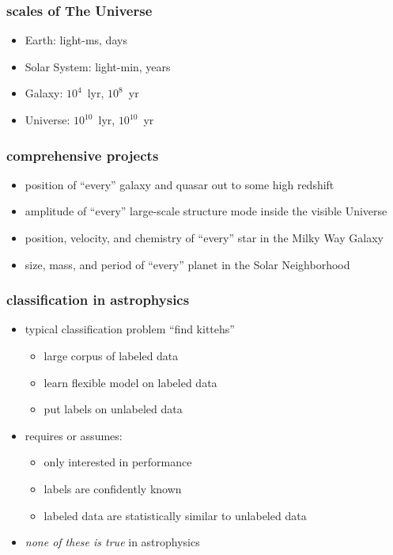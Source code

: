 \documentclass[pdftex]{beamer}
\begin{document}
\begin{frame}
  \frametitle{scales of The Universe}
  \begin{itemize}
  \item Earth: light-ms, days
  \item Solar System: light-min, years
  \item Galaxy: $10^4$~lyr, $10^8$~yr
  \item Universe: $10^10$~lyr, $10^10$~yr
  \end{itemize}
\end{frame}

\begin{frame}
  \frametitle{comprehensive projects}
  \begin{itemize}
  \item position of ``every'' galaxy and quasar out to some high redshift
  \item amplitude of ``every'' large-scale structure mode inside the visible Universe
  \item position, velocity, and chemistry of ``every'' star in the Milky Way Galaxy
  \item size, mass, and period of ``every'' planet in the Solar Neighborhood
  \end{itemize}
\end{frame}

\begin{frame}
  \frametitle{classification in astrophysics}
  \begin{itemize}
  \item typical classification problem ``find kittehs''
    \begin{itemize}
    \item large corpus of labeled data
    \item learn flexible model on labeled data
    \item put labels on unlabeled data
    \end{itemize}
  \item requires or assumes:
    \begin{itemize}
    \item only interested in performance
    \item labels are confidently known
    \item labeled data are statistically similar to unlabeled data
    \end{itemize}
  \item \emph{none of these is true} in astrophysics
  \end{itemize}
\end{frame}
\end{document}
